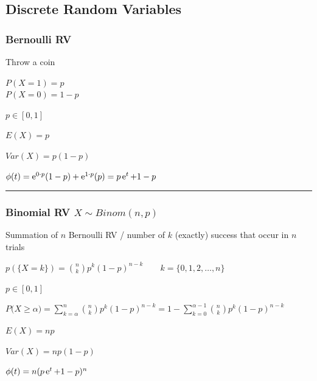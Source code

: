 \subsection{Discrete Random Variables }
\subsubsection{Bernoulli RV }
\begin{minipage}{10cm}
	\begin{liste}
		\item Throw a coin
		\item $P(X=1)=p$\\$P(X=0)=1-p$
		\item $p\in[0,1]$
	\end{liste}
\end{minipage}
\hfill
\begin{minipage}{8cm}
	\begin{liste}
		\item $E(X)=p$
		\item $Var(X)=p(1-p)$
		\item $\phi(t)=\operatorname{\mathrm e}^{0\cdot p}(1-p)+\operatorname{\mathrm e}^{1\cdot p}(p)=p\operatorname{\mathrm e}^t+1-p$
	\end{liste}
\end{minipage}
\hfill

	\vspace{2mm}
	\hrule
	\vspace{3mm}

\subsubsection{Binomial RV $X\sim Binom(n,p)$ }
	\begin{liste}
			\item Summation of $n$ Bernoulli RV / number of $k$ (exactly) success that occur in $n$ trials
	\end{liste}
\begin{minipage}{12cm}
	\begin{liste}
		\item $\boxed{p(\{X=k\}) = \binom n k p^k(1-p)^{n-k}\qquad k=\{0,1,2,\ldots,n\}}$
		\vspace{0.2cm}
		\item $p\in[0,1]$
		\vspace{0.2cm}
		\item $\boxed{P\big(X\geq\alpha\big)=\sum\limits_{k=\alpha}^{n}{\binom n k p^k(1-p)^{n-k}}}=1-\sum\limits_{k=0}^{\alpha-1}{\binom n k p^k(1-p)^{n-k}}$
	\end{liste}
\end{minipage}
\hfill
\begin{minipage}{7cm}
	\begin{liste}
		\item $E(X)=np$
		\item $Var(X)=np(1-p)$
		\item $\phi(t)=n(p\operatorname{\mathrm e}^t+1-p)^n$
	\end{liste}
\end{minipage}
\hfill\\



